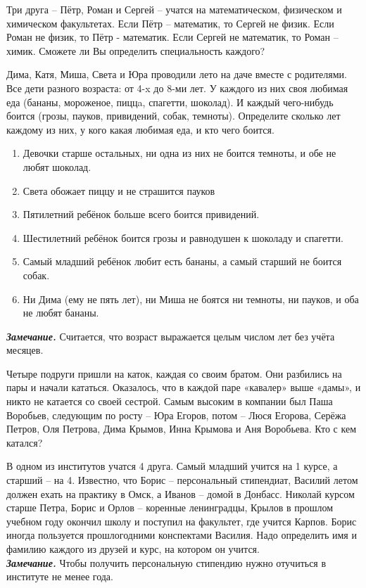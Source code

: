 \begin{thm}
    Три друга – Пётр, Роман и Сергей – учатся на математическом, физическом и химическом факультетах. Если Пётр – математик, то Сергей не физик. Если Роман не физик, то Пётр - математик. Если Сергей не математик, то Роман – химик. Сможете ли Вы определить специальность каждого?
\end{thm}

\begin{thm}
    Дима, Катя, Миша, Света и Юра проводили лето на даче вместе с родителями. Все дети разного возраста: от 4-x до 8-ми лет. У каждого из них своя любимая еда (бананы, мороженое, пиццa, спагетти, шоколад). И каждый чего-нибудь боится (грозы, пауков, привидений, собак, темноты). Определите сколько лет каждому из них, у кого какая любимая еда, и кто чего боится.

    \begin{enumerate}
        \item Девочки старше остальных, ни одна из них не боится темноты, и обе не любят шоколад.
        \item Света обожает пиццу и не страшится пауков
        \item Пятилетний ребёнок больше всего боится привидений.
        \item Шестилетний ребёнок боится грозы и равнодушен к шоколаду и спагетти.
        \item Самый младший ребёнок любит есть бананы, а самый старший не боится собак.
        \item Ни Дима (ему не пять лет), ни Миша не боятся ни темноты, ни пауков, и оба не любят бананы.
    \end{enumerate}
    \textit{\textbf{Замечание.}} Считается, что возраст выражается целым числом лет без учёта месяцев.
\end{thm}

\begin{thm}
    Четыре подруги пришли на каток, каждая со своим братом. Они разбились на пары и начали кататься. Оказалось, что в каждой паре «кавалер» выше «дамы», и никто не катается со своей сестрой. Самым высоким в компании был Паша Воробьев, следующим по росту – Юра Егоров, потом – Люся Егорова, Серёжа Петров, Оля Петрова, Дима Крымов, Инна Крымова и Аня Воробьева. Кто с кем катался?
\end{thm}

\newpage

\begin{thm}
    В одном из институтов учатся 4 друга. Самый младший учится на 1 курсе, а старший – на 4. Известно, что Борис – персональный стипендиат, Василий летом должен ехать на практику в Омск, а Иванов – домой в Донбасс. Николай курсом старше Петра, Борис и Орлов – коренные ленинградцы, Крылов в прошлом учебном году окончил школу и поступил на факультет, где учится Карпов. Борис иногда пользуется прошлогодними конспектами Василия. Надо определить имя и фамилию каждого из друзей и курс, на котором он учится.
    \\
    \textit{\textbf{Замечание.}} Чтобы получить персональную стипендию нужно отучиться в институте не менее года.
\end{thm}


